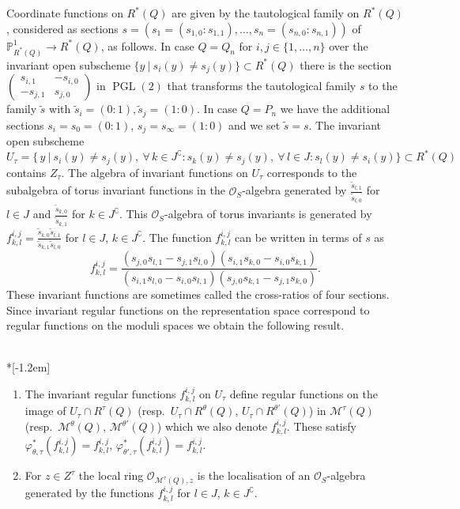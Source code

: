 \documentclass[ALCO,ThmDefs,Unicode,epreuves]{cedram}
\def\phi{\varphi}
\def\P{\mathds P}
\def\O{\mathcal O}
\DeclareMathOperator{\PGL}{PGL}
\begin{document}
Coordinate functions on $R^*(Q)$ are given by the tautological family on $R^*(Q)$, 
considered as sections 
$s=(s_1\!=\!(s_{1,0}\!:\!s_{1,1}),\ldots,s_n\!=\!(s_{n,0}\!:\!s_{n,1}))$ 
of $\P^1_{R^*(Q)}\to R^*(Q)$, as follows. 
In case $Q=Q_n$ for $i,j\in\{1,\ldots,n\}$ over the invariant open subscheme 
$\{y\:|\:s_i(y)\neq s_j(y)\}\subset R^*(Q)$ there is the section
$\left(\begin{smallmatrix} s_{i,1}&-s_{i,0}\\ -s_{j,1}&s_{j,0}\end{smallmatrix}\right)$
in $\PGL(2)$ that transforms the tautological family $s$ to the family $\tilde{s}$ 
with $\tilde{s}_i=(0:1),\tilde{s}_j=(1:0)$.
In case $Q=P_n$ we have the additional sections $s_i=s_0=(0:1)$, $s_j=s_\infty=(1:0)$ 
and we set $\tilde{s}=s$.
The invariant open subscheme 
\[
U_\tau=\big\{\,y\:\big|\:s_i(y)\neq s_j(y),\:
\forall\,k\!\in\!J^\complement\colon s_k(y)\neq s_j(y),\:
\forall\,l\!\in\!J\colon s_l(y)\neq s_i(y)\big\}\subset R^*(Q)
\]
contains $Z_\tau$. The algebra of invariant functions on $U_\tau$ corresponds to 
the subalgebra of torus invariant functions in the $\O_S$-algebra generated by 
$\frac{\tilde{s}_{l,1}}{\tilde{s}_{l,0}}$ for $l\in J$ and
$\frac{\tilde{s}_{k,0}}{\tilde{s}_{k,1}}$ for $k\in J^\complement$. 
This $\O_S$-algebra of torus invariants is generated by 
$f^{i,j}_{k,l}=\frac{\tilde{s}_{k,0}\tilde{s}_{l,1}}{\tilde{s}_{k,1}\tilde{s}_{l,0}}$
for $l\in J$, $k\in J^\complement$.
The function $f^{i,j}_{k,l}$ can be written in terms of $s$ as
\[
f^{i,j}_{k,l}=\frac{(s_{j,0}s_{l,1}-s_{j,1}s_{l,0})(s_{i,1}s_{k,0}-s_{i,0}s_{k,1})}
{(s_{i,1}s_{l,0}-s_{i,0}s_{l,1})(s_{j,0}s_{k,1}-s_{j,1}s_{k,0})}.
\]
These invariant functions are sometimes called the cross-ratios of four sections.
Since invariant regular functions on the representation space correspond to regular 
functions on the moduli spaces we obtain the following result.

\begin{lemma}\ \\*[-1.2em]\label{le:fijlk}

\begin{enumerate}[label=(\alph*)]
\item\label{lemma2.13_a}
The invariant regular functions $f^{i,j}_{k,l}$ on $U_\tau$ define 
regular functions on the image of $U_\tau\cap R^\tau(Q)$ (resp.\ $U_\tau\cap R^\theta(Q)$,
$U_\tau\cap R^{\theta'}(Q)$) in $\mathcal M^\tau(Q)$ (resp.\ $\mathcal M^\theta(Q)$, 
$\mathcal M^{\theta'}(Q)$) which we also denote $f^{i,j}_{k,l}$.
These satisfy $\phi_{\theta,\tau}^*(f^{i,j}_{k,l})=f^{i,j}_{k,l}$,
$\phi_{\theta',\tau}^*(f^{i,j}_{k,l})=f^{i,j}_{k,l}$. %

\item\label{lemma2.13_b}
For $z\in Z^\tau$ the local ring $\O_{\mathcal M^\tau(Q),z}$ is the 
localisation of an $\O_S$-algebra generated by the functions $f^{i,j}_{k,l}$ for 
$l\in J$, $k\in J^\complement$.
\end{enumerate}
\end{lemma}
\end{document}
